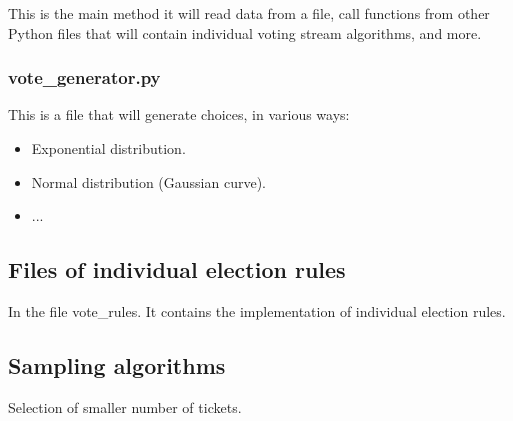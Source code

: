 \documentclass[a4paper,12pt]{report}
\begin{document}
	This is the main method it will read data from a file, call functions from other Python files that will contain individual voting stream algorithms, and more.
	
	\subsubsection{vote\_generator.py}
	
	This is a file that will generate choices, in various ways:
	
	\begin{itemize}
		\item Exponential distribution.
		\item Normal distribution (Gaussian curve).
		\item ...
	\end{itemize}
	
	\subsection{Files of individual election rules}
	
	In the file vote\_rules. It contains the implementation of individual election rules.
	
	\subsection{Sampling algorithms}
	
	Selection of smaller number of tickets.
	
	
	
	
	
	
	
	
	
	
	
	
\end{document}

